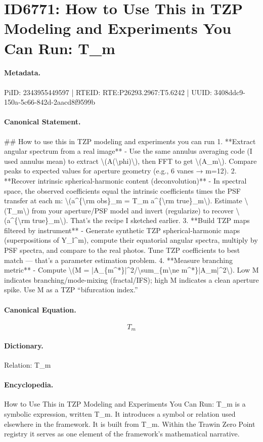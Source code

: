 \section*{ID6771: How to Use This in TZP Modeling and Experiments You Can Run: T\_m}
\paragraph{Metadata.}
PiID: 2343955449597 | RTEID: RTE:P26293.2967:T5.6242 | UUID: 3408ddc9-150a-5c66-842d-2aacd8f9599b

\paragraph{Canonical Statement.}
\#\# How to use this in TZP modeling and experiments you can run 1. **Extract angular spectrum from a real image** - Use the same annulus averaging code (I used annulus mean) to extract \textbackslash{}(A(\textbackslash{}phi)\textbackslash{}), then FFT to get \textbackslash{}(A\_m\textbackslash{}). Compare peaks to expected values for aperture geometry (e.g., 6 vanes → m=12). 2. **Recover intrinsic spherical-harmonic content (deconvolution)** - In spectral space, the observed coefficients equal the intrinsic coefficients times the PSF transfer at each m: \textbackslash{}(a\textasciicircum{}\{\textbackslash{}rm obs\}\_m = T\_m a\textasciicircum{}\{\textbackslash{}rm true\}\_m\textbackslash{}). Estimate \textbackslash{}(T\_m\textbackslash{}) from your aperture/PSF model and invert (regularize) to recover \textbackslash{}(a\textasciicircum{}\{\textbackslash{}rm true\}\_m\textbackslash{}). That’s the recipe I sketched earlier. 3. **Build TZP maps filtered by instrument** - Generate synthetic TZP spherical-harmonic maps (superpositions of Y\_l\textasciicircum{}m), compute their equatorial angular spectra, multiply by PSF spectra, and compare to the real photos. Tune TZP coefficients to best match — that’s a parameter estimation problem. 4. **Measure branching metric** - Compute \textbackslash{}(M = |A\_\{m\textasciicircum{}*\}|\textasciicircum{}2/\textbackslash{}sum\_\{m\textbackslash{}ne m\textasciicircum{}*\}|A\_m|\textasciicircum{}2\textbackslash{}). Low M indicates branching/mode-mixing (fractal/IFS); high M indicates a clean aperture spike. Use M as a TZP “bifurcation index.”

\paragraph{Canonical Equation.}
\[
T_m
\]

\paragraph{Dictionary.}
Relation: T\_m

\paragraph{Encyclopedia.}
How to Use This in TZP Modeling and Experiments You Can Run: T\_m is a symbolic expression, written T\_m. It introduces a symbol or relation used elsewhere in the framework. It is built from T\_m. Within the Trawin Zero Point registry it serves as one element of the framework's mathematical narrative.
